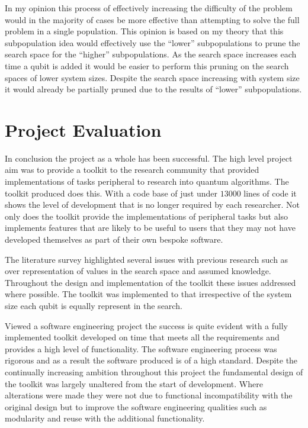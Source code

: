 In my opinion this process of effectively increasing the difficulty of the problem would in the majority of cases be more effective than attempting to solve the full problem in a single population.
This opinion is based on my theory that this subpopulation idea would effectively use the ``lower'' subpopulations to prune the search space for the ``higher'' subpopulations.
As the search space increases each time a qubit is added it would be easier to perform this pruning on the search spaces of lower system sizes.
Despite the search space increasing with system size it would already be partially pruned due to the results of ``lower'' subpopulations.

\section{Project Evaluation}

In conclusion the project as a whole has been successful.
The high level project aim was to provide a toolkit to the research community that provided implementations of tasks peripheral to research into quantum algorithms.
The toolkit produced does this.
With a code base of just under $13000$ lines of code it shows the level of development that is no longer required by each researcher.
Not only does the toolkit provide the implementations of peripheral tasks but also implements features that are likely to be useful to users that they may not have developed themselves as part of their own bespoke software.

The literature survey highlighted several issues with previous research such as over representation of values in the search space and assumed knowledge.
Throughout the design and implementation of the toolkit these issues addressed where possible.
The toolkit was implemented to that irrespective of the system size each qubit is equally represent in the search.

Viewed a software engineering project the success is quite evident with a fully implemented toolkit developed on time that meets all the requirements and provides a high level of functionality.
The software engineering process was rigorous and as a result the software produced is of a high standard.
Despite the continually increasing ambition throughout this project the fundamental design of the toolkit was largely unaltered from the start of development.
Where alterations were made they were not due to functional incompatibility with the original design but to improve the software engineering qualities such as modularity and reuse with the additional functionality.

